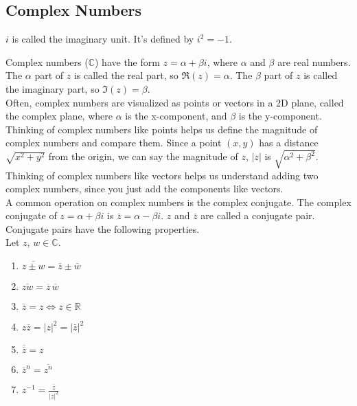 \subsection{Complex Numbers}
\begin{definition}
	$i$ is called the imaginary unit. It's defined by $i^2 = -1$.
\end{definition}



Complex numbers ($\mathbb{C}$) have the form $z = \alpha + \beta i$, where $\alpha$ and $\beta$ are real numbers. The $\alpha$ part of $z$ is called the real part, so $\Re(z) = \alpha$. The $\beta$ part of $z$ is called the imaginary part, so $\Im(z) = \beta$.\\


Often, complex numbers are visualized as points or vectors in a 2D plane, called the complex plane, where $\alpha$ is the x-component, and $\beta$ is the y-component. Thinking of complex numbers like points helps us define the magnitude of complex numbers and compare them. Since a point $(x,y)$ has a distance $\sqrt{x^2+y^2}$ from the origin, we can say the magnitude of $z$, $\lvert z \rvert$ is $\sqrt{\alpha^2 + \beta^2}$. Thinking of complex numbers like vectors helps us understand adding two complex numbers, since you just add the components like vectors.\\


A common operation on complex numbers is the complex conjugate. The complex conjugate of $z = \alpha + \beta i$ is $\overline{z} = \alpha - \beta i$. $z$ and $\overline{z}$ are called a conjugate pair.\\


Conjugate pairs have the following properties.
\\Let $z$, $w \in \mathbb{C}$.
\begin{enumerate}[label=]
	\item $\overline{z \pm w} = \overline{z} \pm \overline{w}$
	\item $\overline{zw}=\overline{z}\hspace{2pt}\overline{w}$
	\item $\overline{z}=z \Leftrightarrow z \in \mathbb{R}$
	\item $z\overline{z} = \lvert z \rvert^2 = \lvert \overline{z} \rvert^2$
	\item $\overline{\overline{z}} = z$
	\item $\overline{z}^n = \overline{z^n}$
	\item $z^{-1} = \frac{\overline{z}}{\lvert z \rvert^2}$
\end{enumerate}